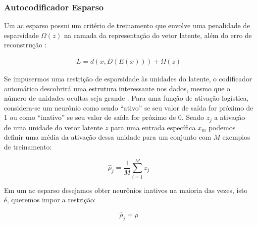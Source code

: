





\subsubsection{Autocodificador Esparso} \label{sec:ac_es}

Um \acrshort{ac} esparso possui um critério de treinamento que envolve uma penalidade de esparsidade $\Omega(z)$ na camada da representação do vetor latente, além do erro de reconstrução \cite{Goodfellow2016}:

\begin{equation}
\label{eq:loss_sparse}
\begin{aligned}
L = d(x,D(E(x))) + \Omega(z) 
\end{aligned}
\end{equation}

Se impusermos uma restrição de esparsidade às unidades do latente, o codificador automático descobrirá uma estrutura interessante nos dados, mesmo que o número de unidades ocultas seja grande \cite{ng2011sparse}. 
Para uma função de ativação logística, considera-se um neurônio como sendo ``ativo'' se seu valor de saída for próximo de 1 ou como ``inativo'' se seu valor de saída for próximo de 0. Sendo $z_j$ a ativação de uma unidade do vetor latente ${z}$ para uma entrada específica $x_m$ podemos definir uma média da ativação dessa unidade para um conjunto com $M$ exemplos de treinamento:

\begin{equation}
\hat{\rho}_{j} = \frac{1}{M}\sum_{i=1}^M z_j
\end{equation}

Em um \acrshort{ac} esparso desejamos obter neurônios inativos na maioria das vezes, isto é, queremos impor a restrição:

\begin{equation}
\hat{\rho}_{j} = \rho
\end{equation}


